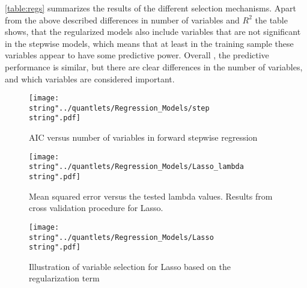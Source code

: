 \autoref{table:regs} summarizes the results of the different selection mechanisms. Apart from the above described differences in number of variables and  $R^{2}$ the table shows, that the regularized models also include variables that are not significant in the stepwise models, which means that at least in the training sample these variables appear to have some predictive power. Overall , the predictive performance is similar, but there are clear differences in the number of variables, and which variables are considered important. 
\FloatBarrier
\begin{figure}[H]
  \centering
\texttt{[image: \\string"../quantlets/Regression\_Models/step\\string".pdf]}
  \caption{AIC versus number of variables in forward stepwise regression}\label{fig:step}
\end{figure}
 
\begin{figure}[H]
  \centering
\texttt{[image: \\string"../quantlets/Regression\_Models/Lasso\_lambda\\string".pdf]}
  \caption{Mean squared error versus the tested lambda values. Results from cross validation procedure for Lasso.}\label{fig:Lasso}
\end{figure}

\begin{figure}[H]
  \centering
\texttt{[image: \\string"../quantlets/Regression\_Models/Lasso\\string".pdf]}
  \caption{Illustration of variable selection for Lasso based on the regularization term}\label{fig:Lasso1}
\end{figure}

 

 

 
\FloatBarrier